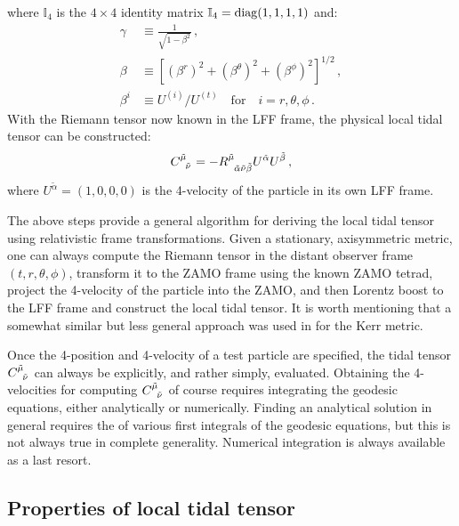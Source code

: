 \documentclass[
    reprint,
    prd,
    nofootinbib,
    amsmath,amssymb,
    aps,
    floatfix,
]{revtex4-2}
\begin{document}
where $\mathbb{I}_{4}$ is the $4 \times 4$ identity matrix $\mathbb{I}_{4}={\rm diag}(1, 1, 1, 1)$ and:
\begin{equation}
    \begin{split}
        \gamma &\equiv \frac{1}{\sqrt{1 - \beta^{2}}} \, , \\
        \beta &\equiv \left[ {(\beta^{r})^{2} + (\beta^{\theta})^{2} + (\beta^{\phi})^{2}} \right]^{1/2} \, , \\
        \beta^{i} &\equiv U^{(i)} / U^{(t)} \quad \text{for} \quad i = r, \theta, \phi \, .
    \end{split}
\end{equation}
With the Riemann tensor now known in the LFF frame, the physical local tidal tensor can be constructed:
\begin{equation}
    \tensor{C}{^{\tilde{\mu}}_{\tilde{\nu}}} = -\tensor{R}{^{\tilde{\mu}}_{\tilde{\alpha} \tilde{\nu} \tilde{\beta}}} U^{\tilde{\alpha}} U^{\tilde{\beta}} \, ,
    \label{eq:local_tidal_tensor}
\end{equation}
where $U^{\tilde{\alpha}} = (1, 0, 0, 0)$ is the 4-velocity of the particle in its own LFF frame.

The above steps provide a general algorithm for deriving the local tidal tensor using relativistic frame transformations. Given a stationary, axisymmetric metric, one can always compute the Riemann tensor in the distant observer frame $(t, r, \theta, \phi)$, transform it to the ZAMO frame using the known ZAMO tetrad, project the 4-velocity of the particle into the ZAMO, and then Lorentz boost to the LFF frame and construct the local tidal tensor. It is worth mentioning that a somewhat similar but less general approach was used in \cite{Chicone2006} for the Kerr metric.

Once the 4-position and 4-velocity of a test particle are specified, the tidal tensor $\tensor{C}{^{\tilde{\mu}}_{\tilde{\nu}}}$ can always be explicitly, and rather simply, evaluated. Obtaining the 4-velocities for computing $\tensor{C}{^{\tilde{\mu}}_{\tilde{\nu}}}$ of course requires integrating the geodesic equations, either analytically or numerically. Finding an analytical solution in general requires the  of various first integrals of the geodesic equations, but this is not always true in complete generality. Numerical integration is always available as a last resort.


\subsection{Properties of local tidal tensor}
\end{document}

